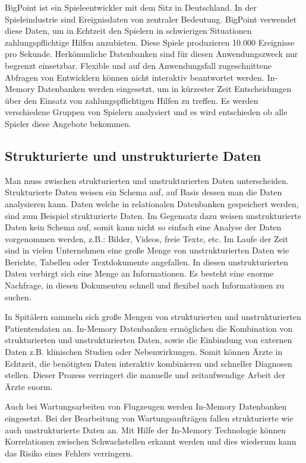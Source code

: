 \documentclass[draft,final]{vutinfth} %
\begin{document}
BigPoint ist ein Spieleentwickler mit dem Sitz in Deutschland. In der Spieleindustrie sind Ereignisdaten von zentraler Bedeutung. BigPoint verwendet diese Daten, um in Echtzeit den Spielern in schwierigen Situationen zahlungspflichtige Hilfen anzubieten. Diese Spiele produzieren 10.000 Ereignisse pro Sekunde. Herkömmliche Datenbanken sind für diesen Anwendungszweck nur begrenzt einsetzbar. Flexible und auf den Anwendungsfall zugeschnittene Abfragen von Entwicklern können nicht interaktiv beantwortet werden. In-Memory Datenbanken werden eingesetzt, um in kürzester Zeit Entscheidungen über den Einsatz von zahlungspflichtigen Hilfen zu treffen. Es werden verschiedene Gruppen von Spielern analysiert und es wird entschieden ob alle Spieler diese Angebote bekommen.

\subsection*{Strukturierte und unstrukturierte Daten}
Man muss zwischen strukturierten und unstrukturierten Daten unterscheiden. Strukturierte Daten weisen ein Schema auf, auf Basis dessen man die Daten analysieren kann. Daten welche in relationalen Datenbanken gespeichert werden, sind zum Beispiel strukturierte Daten. Im Gegensatz dazu weisen unstrukturierte Daten kein Schema auf, somit kann nicht so einfach eine Analyse der Daten vorgenommen werden, z.B.: Bilder, Videos, freie Texte, etc. Im Laufe der Zeit sind in vielen Unternehmen eine gro\ss e Menge von unstrukturierten Daten wie Berichte, Tabellen oder Textdokumente angefallen. In diesen unstrukturierten Daten verbirgt sich eine Menge an Informationen. Es besteht eine enorme Nachfrage, in diesen Dokumenten schnell und flexibel nach Informationen zu suchen.

In Spitälern sammeln sich gro\ss e Mengen von strukturierten und unstrukturierten Patientendaten an. In-Memory Datenbanken ermöglichen die Kombination von strukturierten und unstrukturierten Daten, sowie die Einbindung von externen Daten z.B. klinischen Studien oder Nebenwirkungen. Somit können Ärzte in Echtzeit, die benötigten Daten interaktiv kombinieren und schneller Diagnosen stellen. Dieser Prozess verringert die manuelle und zeitaufwendige Arbeit der Ärzte enorm.

Auch bei Wartungsarbeiten von Flugzeugen werden In-Memory Datenbanken eingesetzt. Bei der Bearbeitung von Wartungsaufträgen fallen strukturierte wie auch unstrukturierte Daten an. Mit Hilfe der In-Memory Technologie können Korrelationen zwischen Schwachstellen erkannt werden und dies wiederum kann das Risiko eines Fehlers verringern.
\end{document}
